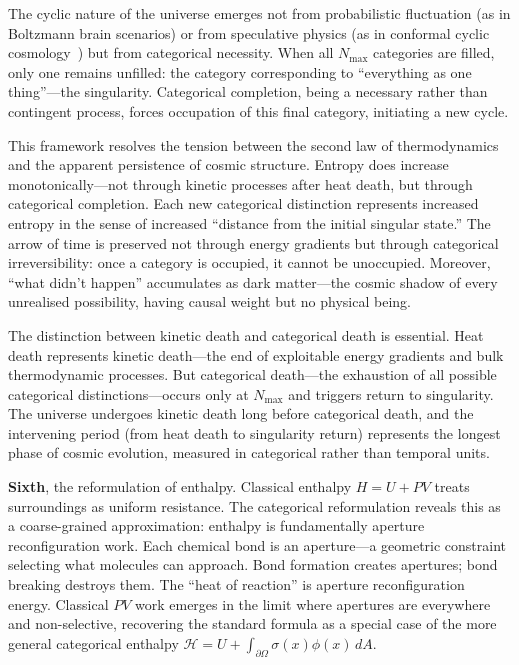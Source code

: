 \documentclass[12pt,a4paper]{article}
\theoremstyle{definition}
\theoremstyle{remark}
\newcommand{\Nmax}{N_{\text{max}}}
\begin{document}
The cyclic nature of the universe emerges not from probabilistic fluctuation (as in Boltzmann brain scenarios) or from speculative physics (as in conformal cyclic cosmology~\citep{penrose2010cycles}) but from categorical necessity. When all $\Nmax$ categories are filled, only one remains unfilled: the category corresponding to ``everything as one thing''---the singularity. Categorical completion, being a necessary rather than contingent process, forces occupation of this final category, initiating a new cycle.

This framework resolves the tension between the second law of thermodynamics and the apparent persistence of cosmic structure. Entropy does increase monotonically---not through kinetic processes after heat death, but through categorical completion. Each new categorical distinction represents increased entropy in the sense of increased ``distance from the initial singular state.'' The arrow of time is preserved not through energy gradients but through categorical irreversibility: once a category is occupied, it cannot be unoccupied. Moreover, ``what didn't happen'' accumulates as dark matter---the cosmic shadow of every unrealised possibility, having causal weight but no physical being.

The distinction between kinetic death and categorical death is essential. Heat death represents kinetic death---the end of exploitable energy gradients and bulk thermodynamic processes. But categorical death---the exhaustion of all possible categorical distinctions---occurs only at $\Nmax$ and triggers return to singularity. The universe undergoes kinetic death long before categorical death, and the intervening period (from heat death to singularity return) represents the longest phase of cosmic evolution, measured in categorical rather than temporal units.

\textbf{Sixth}, the reformulation of enthalpy. Classical enthalpy $H = U + PV$ treats surroundings as uniform resistance. The categorical reformulation reveals this as a coarse-grained approximation: enthalpy is fundamentally aperture reconfiguration work. Each chemical bond is an aperture---a geometric constraint selecting what molecules can approach. Bond formation creates apertures; bond breaking destroys them. The ``heat of reaction'' is aperture reconfiguration energy. Classical $PV$ work emerges in the limit where apertures are everywhere and non-selective, recovering the standard formula as a special case of the more general categorical enthalpy $\mathcal{H} = U + \int_{\partial\Omega} \sigma(x) \phi(x) \, dA$.
\end{document}
